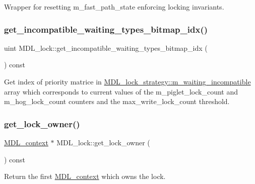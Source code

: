 Wrapper for resetting m\+\_\+fast\+\_\+path\+\_\+state enforcing locking invariants. \mbox{\label{classMDL__lock_afbbc9d77579dd73637b2cc95b7fc249f}} 
\subsubsection{\texorpdfstring{get\+\_\+incompatible\+\_\+waiting\+\_\+types\+\_\+bitmap\+\_\+idx()}{get\_incompatible\_waiting\_types\_bitmap\_idx()}}
{\footnotesize\ttfamily uint M\+D\+L\+\_\+lock\+::get\+\_\+incompatible\+\_\+waiting\+\_\+types\+\_\+bitmap\+\_\+idx (\begin{DoxyParamCaption}{ }\end{DoxyParamCaption}) const\hspace{0.3cm}{\ttfamily [inline]}}

Get index of priority matrice in \mbox{\hyperlink{structMDL__lock_1_1MDL__lock__strategy_a040ce09f82f272cc3162c9eee05d45ef}{M\+D\+L\+\_\+lock\+\_\+strategy\+::m\+\_\+waiting\+\_\+incompatible}} array which corresponds to current values of the m\+\_\+piglet\+\_\+lock\+\_\+count and m\+\_\+hog\+\_\+lock\+\_\+count counters and the max\+\_\+write\+\_\+lock\+\_\+count threshold. \mbox{\label{classMDL__lock_ada93a4c2a1f01792f9c3e352dbf900fc}} 
\subsubsection{\texorpdfstring{get\+\_\+lock\+\_\+owner()}{get\_lock\_owner()}}
{\footnotesize\ttfamily \mbox{\hyperlink{classMDL__context}{M\+D\+L\+\_\+context}} $\ast$ M\+D\+L\+\_\+lock\+::get\+\_\+lock\+\_\+owner (\begin{DoxyParamCaption}{ }\end{DoxyParamCaption}) const\hspace{0.3cm}{\ttfamily [inline]}}

Return the first \mbox{\hyperlink{classMDL__context}{M\+D\+L\+\_\+context}} which owns the lock.

